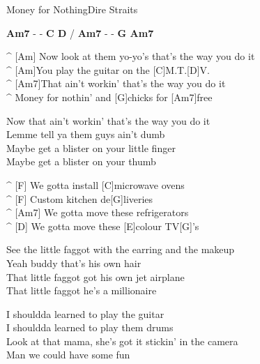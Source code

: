 \vspace{-0.3cm}
\begin{song}{Money for Nothing}{Dire Straits}

\textbf{Am7} - - \textbf{C D} / \textbf{Am7} - - \textbf{G Am7}

\smallskip
\begin{guitar}
^ [Am] Now look at them yo-yo's that's the way you do it\\
^ [Am]You play the guitar on the [C]M.T.[D]V.\\
^ [Am7]That ain't workin' that's the way you do it\\
^ Money for nothin' and [G]chicks for [Am7]free\\
\end{guitar}

\begin{guitar}
Now that ain't workin' that's the way you do it\\
Lemme tell ya them guys ain't dumb\\
Maybe get a blister on your little finger\\
Maybe get a blister on your thumb\\
\end{guitar}

\begin{guitar}
^ [F] We gotta install [C]microwave ovens\\
^ [F] Custom kitchen de[G]liveries\\
^ [Am7] We gotta move these refrigerators\\
^ [D] We gotta move these [E]colour TV[G]'s\\
\end{guitar}


\begin{guitar}
See the little faggot with the earring and the makeup\\
Yeah buddy that's his own hair\\
That little faggot got his own jet airplane\\
That little faggot he's a millionaire\\
\end{guitar}




\begin{guitar}
I shouldda learned to play the guitar\\
I shouldda learned to play them drums\\
Look at that mama, she's got it stickin' in the camera\\
Man we could have some fun\\
\end{guitar}


\end{song}
